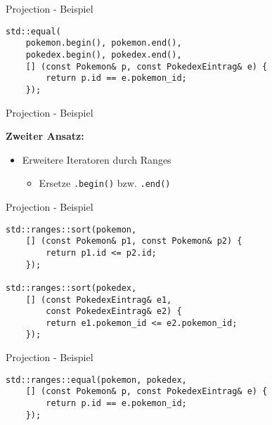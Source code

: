 \begin{frame}[fragile]{Projection - Beispiel}
    \begin{verbatim}
std::equal(
    pokemon.begin(), pokemon.end(),
    pokedex.begin(), pokedex.end(),
    [] (const Pokemon& p, const PokedexEintrag& e) {
        return p.id == e.pokemon_id;
    });
    \end{verbatim}
\end{frame}

\begin{frame}{Projection - Beispiel}
    \begin{center}
        \textbf{Zweiter Ansatz:}
    \end{center}

    \begin{itemize}
        \item Erweitere Iteratoren durch Ranges

              \begin{itemize}
                  \item Ersetze \texttt{.begin()} bzw. \texttt{.end()}
              \end{itemize}
    \end{itemize}
\end{frame}

\begin{frame}[fragile]{Projection - Beispiel}
    \begin{verbatim}
std::ranges::sort(pokemon,
    [] (const Pokemon& p1, const Pokemon& p2) {
        return p1.id <= p2.id;
    });

std::ranges::sort(pokedex,
    [] (const PokedexEintrag& e1,
        const PokedexEintrag& e2) {
        return e1.pokemon_id <= e2.pokemon_id;
    });
    \end{verbatim}
\end{frame}

\begin{frame}[fragile]{Projection - Beispiel}
    \begin{verbatim}
std::ranges::equal(pokemon, pokedex,
    [] (const Pokemon& p, const PokedexEintrag& e) {
        return p.id == e.pokemon_id;
    });
    \end{verbatim}
\end{frame}


